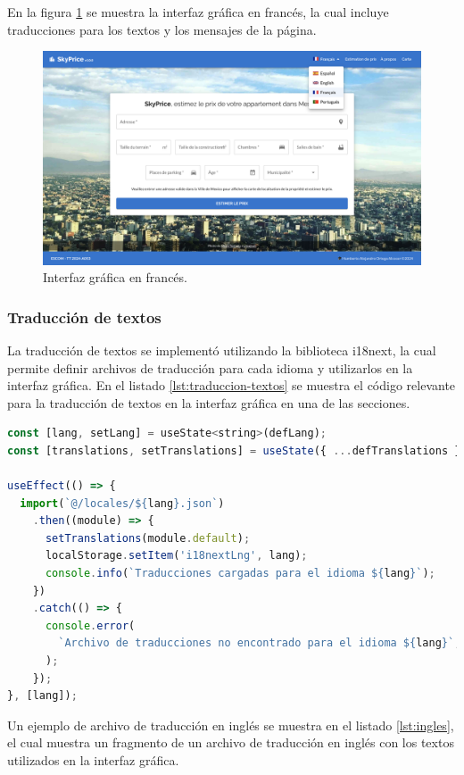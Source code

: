 En la figura \ref{fig:frances} se muestra la interfaz gráfica en francés, la cual
incluye traducciones para los textos y los mensajes de la página.

\begin{figure}[H]
    \centering
    \includegraphics[width=1.0\textwidth]{imagenes/05-implementacion/interfaz-grafica/frances.png}
    \caption{Interfaz gráfica en francés.}
    \label{fig:frances}
\end{figure}

\subsubsection{Traducción de textos}
La traducción de textos se implementó utilizando la biblioteca i18next, la cual
permite definir archivos de traducción para cada idioma y utilizarlos en la interfaz
gráfica. En el listado \ref{lst:traduccion-textos} se muestra el código relevante
para la traducción de textos en la interfaz gráfica en una de las secciones.

\begin{lstlisting}[language=javascript, caption={Traducción de textos}, label={lst:traduccion-textos}]
const [lang, setLang] = useState<string>(defLang);
const [translations, setTranslations] = useState({ ...defTranslations });

useEffect(() => {
  import(`@/locales/${lang}.json`)
    .then((module) => {
      setTranslations(module.default);
      localStorage.setItem('i18nextLng', lang);
      console.info(`Traducciones cargadas para el idioma ${lang}`);
    })
    .catch(() => {
      console.error(
        `Archivo de traducciones no encontrado para el idioma ${lang}`,
      );
    });
}, [lang]);
\end{lstlisting}

Un ejemplo de archivo de traducción en inglés se muestra en el listado \ref{lst:ingles},
el cual muestra un fragmento de un archivo de traducción en inglés con los textos
utilizados en la interfaz gráfica.

